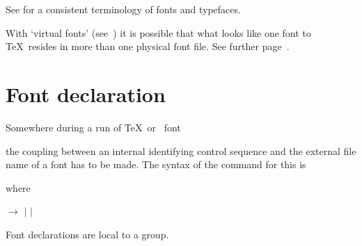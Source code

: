 See \cite{S} for a consistent terminology of fonts and typefaces.

With `virtual fonts' (see~\cite{K:virt}) it is possible that
what looks like one font to \TeX\ resides in more than
one physical font file.
\alt
See further page~\pageref{virtual:fonts}.

\section{Font declaration}

Somewhere during a run of \TeX\ or \IniTeX\ 
\cstoidx font\par
the coupling between an internal identifying control sequence
and the external file name of a font has to be made.
The syntax of the command for this is
\begin{disp}%
\end{disp} 
where
\begin{disp} $\longrightarrow$  
$|$   $|$ \end{disp}
Font declarations are local to a group.

